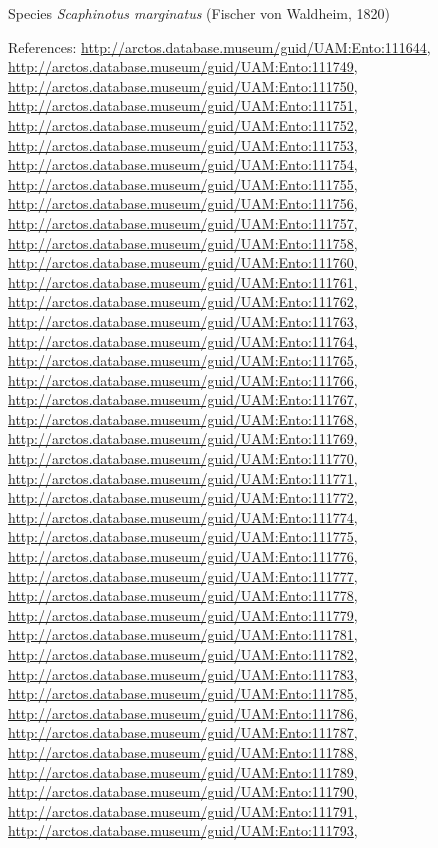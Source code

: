 \documentclass[9pt, article]{memoir}
\begin{document}
\begin{multicols}{2}
\vspace{6pt}\noindent\hspace{36pt}Species \textit{Scaphinotus marginatus} (Fischer von Waldheim, 1820)


References: 
\url{http://arctos.database.museum/guid/UAM:Ento:111644}, 
\url{http://arctos.database.museum/guid/UAM:Ento:111749}, 
\url{http://arctos.database.museum/guid/UAM:Ento:111750}, 
\url{http://arctos.database.museum/guid/UAM:Ento:111751}, 
\url{http://arctos.database.museum/guid/UAM:Ento:111752}, 
\url{http://arctos.database.museum/guid/UAM:Ento:111753}, 
\url{http://arctos.database.museum/guid/UAM:Ento:111754}, 
\url{http://arctos.database.museum/guid/UAM:Ento:111755}, 
\url{http://arctos.database.museum/guid/UAM:Ento:111756}, 
\url{http://arctos.database.museum/guid/UAM:Ento:111757}, 
\url{http://arctos.database.museum/guid/UAM:Ento:111758}, 
\url{http://arctos.database.museum/guid/UAM:Ento:111760}, 
\url{http://arctos.database.museum/guid/UAM:Ento:111761}, 
\url{http://arctos.database.museum/guid/UAM:Ento:111762}, 
\url{http://arctos.database.museum/guid/UAM:Ento:111763}, 
\url{http://arctos.database.museum/guid/UAM:Ento:111764}, 
\url{http://arctos.database.museum/guid/UAM:Ento:111765}, 
\url{http://arctos.database.museum/guid/UAM:Ento:111766}, 
\url{http://arctos.database.museum/guid/UAM:Ento:111767}, 
\url{http://arctos.database.museum/guid/UAM:Ento:111768}, 
\url{http://arctos.database.museum/guid/UAM:Ento:111769}, 
\url{http://arctos.database.museum/guid/UAM:Ento:111770}, 
\url{http://arctos.database.museum/guid/UAM:Ento:111771}, 
\url{http://arctos.database.museum/guid/UAM:Ento:111772}, 
\url{http://arctos.database.museum/guid/UAM:Ento:111774}, 
\url{http://arctos.database.museum/guid/UAM:Ento:111775}, 
\url{http://arctos.database.museum/guid/UAM:Ento:111776}, 
\url{http://arctos.database.museum/guid/UAM:Ento:111777}, 
\url{http://arctos.database.museum/guid/UAM:Ento:111778}, 
\url{http://arctos.database.museum/guid/UAM:Ento:111779}, 
\url{http://arctos.database.museum/guid/UAM:Ento:111781}, 
\url{http://arctos.database.museum/guid/UAM:Ento:111782}, 
\url{http://arctos.database.museum/guid/UAM:Ento:111783}, 
\url{http://arctos.database.museum/guid/UAM:Ento:111785}, 
\url{http://arctos.database.museum/guid/UAM:Ento:111786}, 
\url{http://arctos.database.museum/guid/UAM:Ento:111787}, 
\url{http://arctos.database.museum/guid/UAM:Ento:111788}, 
\url{http://arctos.database.museum/guid/UAM:Ento:111789}, 
\url{http://arctos.database.museum/guid/UAM:Ento:111790}, 
\url{http://arctos.database.museum/guid/UAM:Ento:111791}, 
\url{http://arctos.database.museum/guid/UAM:Ento:111793}, 

\end{multicols}
\end{document}
